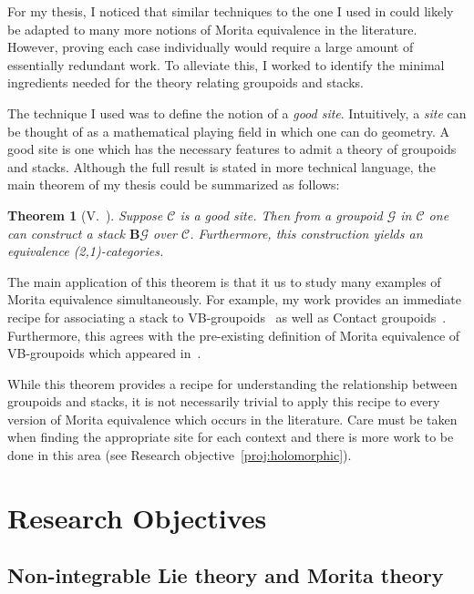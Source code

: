 \documentclass[11pt, letterpaper]{article}
\newcommand{\B}{\mathbf{B}}
\newcommand{\G}{\mathcal{G}}
\newcommand{\C}{\mathcal{C}}
\newtheorem{theorem}{Theorem}
\begin{document}
For my thesis, I noticed that similar techniques to the one I used in \cite{dman} could likely be adapted to many more notions of Morita equivalence in the literature. However, proving each case individually would require a large amount of essentially redundant work. To alleviate this, I worked to identify the minimal ingredients needed for the theory relating groupoids and stacks.

The technique I used was to define the notion of a \emph{good site}. Intuitively, a \emph{site} can be thought of as a mathematical playing field in which one can do geometry. A good site is one which has the necessary features to admit a theory of groupoids and stacks. Although the full result is stated in more technical language, the main theorem of my thesis could be summarized as follows:
\begin{theorem}[V.~\cite{MyThesis}]\label{thm:thesis}
Suppose \(\mathcal{C} \) is a good site. Then from a groupoid \( \G \) in \( \C \) one can construct a stack \( \B \G \) over \( \C \). Furthermore, this construction yields an equivalence (2,1)-categories.
\end{theorem}
The main application of this theorem is that it us to study many examples of Morita equivalence simultaneously. For example, my work provides an immediate recipe for associating a stack to VB-groupoids~\cite{del_Hoyo_2018} as well as Contact groupoids~\cite{Contact_Red}. 
Furthermore, this agrees with the pre-existing definition of Morita equivalence of VB-groupoids which appeared in~\cite{del_Hoyo_2018}.

While this theorem provides a recipe for understanding the relationship between groupoids and stacks, it is not necessarily trivial to apply this recipe to every version of Morita equivalence which occurs in the literature. Care must be taken when finding the appropriate site for each context and there is more work to be done in this area (see Research objective~\ref{proj:holomorphic}).




\section{Research Objectives}

\subsection{Non-integrable Lie theory and Morita theory}\label{proj:non.integrable}
\end{document}

